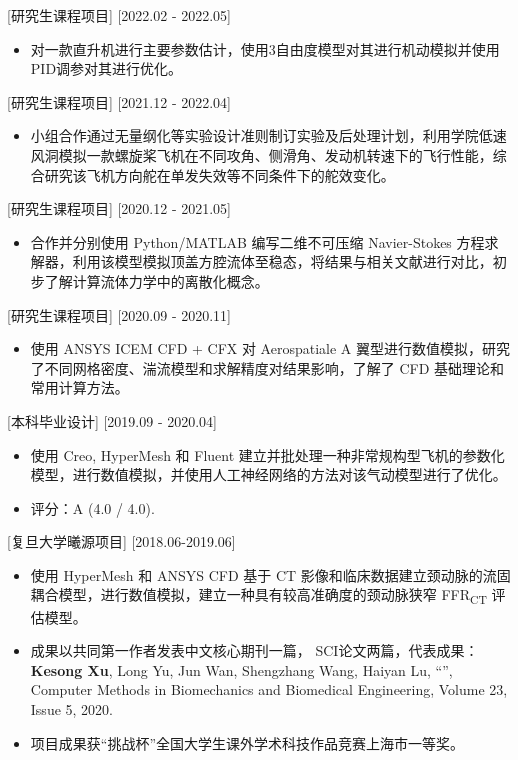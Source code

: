 \documentclass{resume}
\begin{document}
[研究生课程项目]
[2022.02 - 2022.05]

\begin{itemize}
  \item 对一款直升机进行主要参数估计，使用3自由度模型对其进行机动模拟并使用PID调参对其进行优化。
\end{itemize}

[研究生课程项目]
[2021.12 - 2022.04] 

\begin{itemize}
  \item 小组合作通过无量纲化等实验设计准则制订实验及后处理计划，利用学院低速风洞模拟一款螺旋桨飞机在不同攻角、侧滑角、发动机转速下的飞行性能，综合研究该飞机方向舵在单发失效等不同条件下的舵效变化。
  \end{itemize}

[研究生课程项目]
[2020.12 - 2021.05] 

\begin{itemize}
  \item 合作并分别使用 Python/MATLAB 编写二维不可压缩 Navier-Stokes 方程求解器，利用该模型模拟顶盖方腔流体至稳态，将结果与相关文献进行对比，初步了解计算流体力学中的离散化概念。
\end{itemize}

[研究生课程项目]
[2020.09 - 2020.11]
\begin{itemize}
  \item 使用 ANSYS ICEM CFD + CFX 对 Aerospatiale A 翼型进行数值模拟，研究了不同网格密度、湍流模型和求解精度对结果影响，了解了 CFD 基础理论和常用计算方法。
\end{itemize}

[本科毕业设计]
[2019.09 - 2020.04]

\begin{itemize}
  \item 使用 Creo, HyperMesh 和 Fluent 建立并批处理一种非常规构型飞机的参数化模型，进行数值模拟，并使用人工神经网络的方法对该气动模型进行了优化。
  \item 评分：A (4.0 / 4.0).
\end{itemize}

[复旦大学曦源项目]
[2018.06-2019.06]
\begin{itemize}
  \item 使用 HyperMesh 和 ANSYS CFD 基于 CT 影像和临床数据建立颈动脉的流固耦合模型，进行数值模拟，建立一种具有较高准确度的颈动脉狭窄 FFR\textsubscript{CT} 评估模型。
  \item 成果以共同第一作者发表中文核心期刊一篇， SCI论文两篇，代表成果：\textbf{Kesong Xu}, Long Yu, Jun Wan, Shengzhang Wang, Haiyan Lu, “”, Computer Methods in Biomechanics and Biomedical Engineering, Volume 23, Issue 5, 2020.
  \item 项目成果获“挑战杯”全国大学生课外学术科技作品竞赛上海市一等奖。
\end{itemize}
\end{document}
